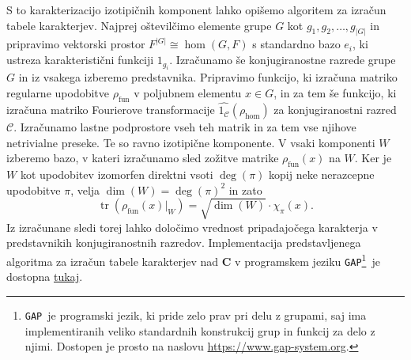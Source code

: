 \documentclass[11pt]{book}
\def\CC{\mathbf{C}}
\def\conclass{\mathcal{C}}
\DeclareMathOperator\tr{tr}
\def\GAP{\texttt{GAP}}
\DeclareMathOperator\fun{fun}
\theoremstyle{definition}
\theoremstyle{zgled}
\theoremstyle{odprtproblem}
\theoremstyle{domacanaloga}
\theoremstyle{izrek}
\begin{document}
S to karakterizacijo izotipičnih komponent lahko opišemo algoritem za izračun tabele karakterjev. Najprej oštevilčimo elemente grupe $G$ kot $g_1, g_2, \dots, g_|G|$ in pripravimo vektorski prostor $F^{|G|} \cong \hom(G,F)$ s standardno bazo $e_i$, ki ustreza karakteristični funkciji $1_{g_i}$. Izračunamo še konjugiranostne razrede grupe $G$ in iz vsakega izberemo predstavnika. Pripravimo funkcijo, ki izračuna matriko regularne upodobitve $\rho_{\fun}$ v poljubnem elementu $x \in G$, in za tem še funkcijo, ki izračuna matriko Fourierove transformacije $\widehat{1_{\conclass}}(\rho_{\hom})$ za konjugiranostni razred $\conclass$. Izračunamo lastne podprostore vseh teh matrik in za tem vse njihove netrivialne preseke. Te so ravno izotipične komponente. V vsaki komponenti $W$ izberemo bazo, v kateri izračunamo sled zožitve matrike $\rho_{\fun}(x)$ na $W$. Ker je $W$ kot upodobitev izomorfen direktni vsoti $\deg(\pi)$ kopij neke nerazcepne upodobitve $\pi$, velja $\dim(W) = \deg(\pi)^2$ in zato
\[
    \tr(\rho_{\fun}(x) |_W) = \sqrt{\dim(W)} \cdot \chi_{\pi}(x).
\]
Iz izračunane sledi torej lahko določimo vrednost pripadajočega karakterja v predstavnikih konjugiranostnih razredov. Implementacija predstavljenega algoritma za izračun tabele karakterjev nad $\CC$ v programskem jeziku \GAP\footnote{\GAP~je programski jezik, ki pride zelo prav pri delu z grupami, saj ima implementiranih veliko standardnih konstrukcij grup in funkcij za delo z njimi. Dostopen je prosto na naslovu \url{https://www.gap-system.org}.}~je dostopna \href{https://github.com/urbanjezernik/teorija-upodobitev/blob/main/racunanje-tabele.g}{tukaj}.
\end{document}
